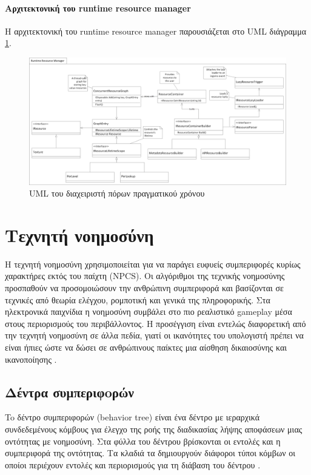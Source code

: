 \paragraph{Αρχιτεκτονική του runtime resource manager}
Η αρχιτεκτονική του runtime resource manager παρουσιάζεται στο \gls{UML} διάγραμμα \ref{fig:runtime_resource_uml}.
\begin{figure}[h!]
	\centering
	\includegraphics[width=165mm]{Images/runtime_resource_manager}
	\caption{UML του διαχειριστή πόρων πραγματικού χρόνου}
	\label{fig:runtime_resource_uml}
\end{figure}

\section{Τεχνητή νοημοσύνη}
Η τεχνητή νοημοσύνη χρησιμοποιείται για να παράγει ευφυείς συμπεριφορές κυρίως χαρακτήρες εκτός του παίχτη (NPCS). Οι αλγόριθμοι της τεχνικής νοημοσύνης προσπαθούν να προσομοιώσουν την ανθρώπινη συμπεριφορά και βασίζονται σε τεχνικές από θεωρία ελέγχου, ρομποτική και γενικά της πληροφορικής. Στα ηλεκτρονικά παιχνίδια η νοημοσύνη συμβάλει στο πιο ρεαλιστικό gameplay μέσα στους περιορισμούς του περιβάλλοντος. Η προσέγγιση είναι εντελώς διαφορετική από την τεχνητή νοημοσύνη σε άλλα πεδία, γιατί οι ικανότητες του υπολογιστή πρέπει να είναι ήπιες ώστε να δώσει σε ανθρώπινους παίκτες μια αίσθηση δικαιοσύνης και ικανοποίησης \cite{Sousa:2002:GPO:580160}.
 
\subsection{Δέντρα συμπεριφoρών}	
To δέντρο συμπεριφορών (behavior tree) είναι ένα δέντρο με ιεραρχικά συνδεδεμένους κόμβους για έλεγχο της ροής της διαδικασίας λήψης αποφάσεων μιας οντότητας με νοημοσύνη. Στα φύλλα του δέντρου βρίσκονται οι εντολές και η συμπεριφορά της οντότητας. Τα κλαδιά τα δημιουργούν διάφοροι τύποι κόμβων οι οποίοι περιέχουν εντολές και περιορισμούς για τη διάβαση του δέντρου \cite{champandard2007understanding}.

